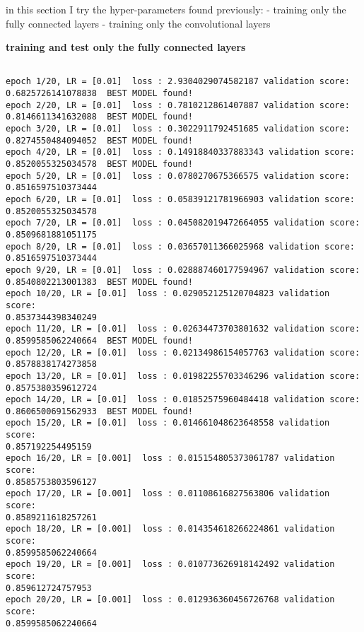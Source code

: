 \documentclass[11pt]{article}
\begin{document}
in this section I try the hyper-parameters found previously: - training
only the fully connected layers - training only the convolutional layers

    \textbf{training and test only the fully connected layers}

    \begin{Verbatim}[commandchars=\\\{\}]

epoch 1/20, LR = [0.01]  loss : 2.9304029074582187 validation score:
0.6825726141078838  BEST MODEL found!
epoch 2/20, LR = [0.01]  loss : 0.7810212861407887 validation score:
0.8146611341632088  BEST MODEL found!
epoch 3/20, LR = [0.01]  loss : 0.3022911792451685 validation score:
0.8274550484094052  BEST MODEL found!
epoch 4/20, LR = [0.01]  loss : 0.14918840337883343 validation score:
0.8520055325034578  BEST MODEL found!
epoch 5/20, LR = [0.01]  loss : 0.0780270675366575 validation score:
0.8516597510373444
epoch 6/20, LR = [0.01]  loss : 0.05839121781966903 validation score:
0.8520055325034578
epoch 7/20, LR = [0.01]  loss : 0.045082019472664055 validation score:
0.8509681881051175
epoch 8/20, LR = [0.01]  loss : 0.03657011366025968 validation score:
0.8516597510373444
epoch 9/20, LR = [0.01]  loss : 0.028887460177594967 validation score:
0.8540802213001383  BEST MODEL found!
epoch 10/20, LR = [0.01]  loss : 0.029052125120704823 validation score:
0.8537344398340249
epoch 11/20, LR = [0.01]  loss : 0.02634473703801632 validation score:
0.8599585062240664  BEST MODEL found!
epoch 12/20, LR = [0.01]  loss : 0.02134986154057763 validation score:
0.8578838174273858
epoch 13/20, LR = [0.01]  loss : 0.01982255703346296 validation score:
0.8575380359612724
epoch 14/20, LR = [0.01]  loss : 0.01852575960484418 validation score:
0.8606500691562933  BEST MODEL found!
epoch 15/20, LR = [0.01]  loss : 0.014661048623648558 validation score:
0.857192254495159
epoch 16/20, LR = [0.001]  loss : 0.015154805373061787 validation score:
0.8585753803596127
epoch 17/20, LR = [0.001]  loss : 0.01108616827563806 validation score:
0.8589211618257261
epoch 18/20, LR = [0.001]  loss : 0.014354618266224861 validation score:
0.8599585062240664
epoch 19/20, LR = [0.001]  loss : 0.010773626918142492 validation score:
0.859612724757953
epoch 20/20, LR = [0.001]  loss : 0.012936360456726768 validation score:
0.8599585062240664
\end{Verbatim}

    \begin{center}
    \end{center}
    { \hspace*{\fill} \\}
    
\end{document}
